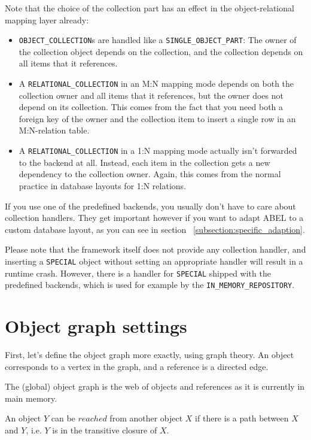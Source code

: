 \documentclass[a4paper,12pt]{report}
\begin{document}
Note that the choice of the collection part has an effect in the object-re\-la\-tio\-nal mapping layer already:
\begin{itemize}
 \item \lstinline!OBJECT_COLLECTION!s are handled like a \lstinline!SINGLE_OBJECT_PART!: The owner of the collection object depends on the collection, and the collection depends on all items that it references.
 \item A \lstinline!RELATIONAL_COLLECTION! in an M:N mapping mode depends on both the collection owner and all items that it references, but the owner does not depend on its collection.
 This comes from the fact that you need both a foreign key of the owner and the collection item to insert a single row in an M:N-relation table.
 \item A \lstinline!RELATIONAL_COLLECTION! in a 1:N mapping mode actually isn't forwarded to the backend at all. 
 Instead, each item in the collection gets a new dependency to the collection owner.
 Again, this comes from the normal practice in database layouts for 1:N relations.
\end{itemize}


If you use one of the predefined backends, you usually don't have to care about collection handlers.
They get important however if you want to adapt ABEL to a custom database layout, as you can see in section ~\ref{subsection:specific_adaption}.

Please note that the framework itself does not provide any collection handler, and inserting a \lstinline!SPECIAL! object without setting an appropriate handler will result in a runtime crash.
However, there is a handler for \lstinline!SPECIAL! shipped with the predefined backends, which is used for example by the \lstinline!IN_MEMORY_REPOSITORY!.

\section{Object graph settings}
\label{subsection:obect_graph_settings}

First, let's define the object graph more exactly, using graph theory.
An object corresponds to a vertex in the graph, and a reference is a directed edge.

The (global) object graph is the web of objects and references as it is currently in main memory.

An object $Y$ can be $reached$ from another object $X$ if there is a path between $X$ and $Y$, i.e. $Y$ is in the transitive closure of $X$.
\end{document}
